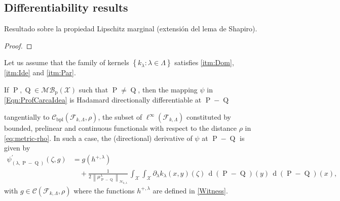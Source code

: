 	\subsection{Differentiability results}
		\begin{Lema}\label{Lema:PartialLipschitz}
			{\color{orange}Resultado sobre la propiedad Lipschitz marginal (extensi\'{o}n del lema de Shapiro).}
		\end{Lema}
		\begin{proof}
			
		\end{proof}
		\begin{Th}
			{\color{orange}Let us assume that the family of kernels $\left\{k_{\lambda}:\lambda\in\Lambda\right\}$ satisfies \ref{itm:Dom}, \ref{itm:Ide} and \ref{itm:Par}.
			
			If $\operatorname{P},\operatorname{Q}\in\mathcal{MB}_{\operatorname{p}}(\mathcal{X})$ such that $\operatorname{P}\neq\operatorname{Q}$, then the mapping $\psi$ in \eqref{Eqn:ProfCarcaIdea} is Hadamard directionally differentiable at $\operatorname{P}-\operatorname{Q}$
			
			tangentially to $\mathcal{C}_{\operatorname{bpl}}\left(\mathcal{F}_{k,\Lambda},\rho\right)$, the subset of $\ell^{\infty}\left(\mathcal{F}_{k,\Lambda}\right)$ constituted by bounded, prelinear and continuous functionals with respect to the distance $\rho$ in \eqref{eq:metric-rho}. In such a case, the (directional) derivative of $\psi$ at $\operatorname{P}-\operatorname{Q}$ is given by
			\begin{equation}\label{Eqn:psi_prime}
				\begin{aligned}
					\psi_{(\lambda,\operatorname{P}-\operatorname{Q})}^{\prime}(\zeta,g)&=g\left(h^{+,\lambda}\right)
					\\
					&\quad+\frac{1}{2\,\left\|\mu_{\operatorname{P}-\operatorname{Q}}^{\lambda}\right\|_{\mathcal{H}_{k,\lambda}}}\,\int_{\mathcal{X}}\int_{\mathcal{X}}\partial_{\lambda}k_{\lambda}(x,y)(\zeta)\,\operatorname{d}(\operatorname{P}-\operatorname{Q})(y)\,\operatorname{d}(\operatorname{P}-\operatorname{Q})(x),
				\end{aligned}
			\end{equation}
			with $g\in\mathcal{C}\left(\mathcal{F}_{k,\Lambda},\rho\right)$ where the functions $h^{+,\lambda}$ are defined in \eqref{Witness}.}
		\end{Th}
